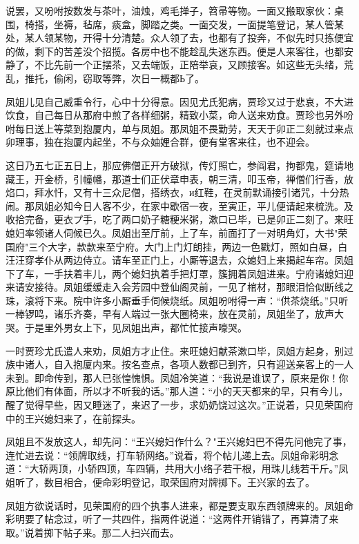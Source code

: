 说罢，又吩咐按数发与茶叶，油烛，鸡毛掸子，笤帚等物。一面又搬取家伙：桌围，椅搭，坐褥，毡席，痰盒，脚踏之类。一面交发，一面提笔登记，某人管某处，某人领某物，开得十分清楚。众人领了去，也都有了投奔，不似先时只拣便宜的做，剩下的苦差没个招揽。各房中也不能趁乱失迷东西。便是人来客往，也都安静了，不比先前一个正摆茶，又去端饭，正陪举哀，又顾接客。如这些无头绪，荒乱，推托，偷闲，窃取等弊，次日一概都Ь了。

凤姐儿见自己威重令行，心中十分得意。因见尤氏犯病，贾珍又过于悲哀，不大进饮食，自己每日从那府中煎了各样细粥，精致小菜，命人送来劝食。贾珍也另外吩咐每日送上等菜到抱厦内，单与凤姐。那凤姐不畏勤劳，天天于卯正二刻就过来点卯理事，独在抱厦内起坐，不与众妯娌合群，便有堂客来往，也不迎会。

这日乃五七正五日上，那应佛僧正开方破狱，传灯照亡，参阎君，拘都鬼，筵请地藏王，开金桥，引幢幡，那道士们正伏章申表，朝三清，叩玉帝，禅僧们行香，放焰口，拜水忏，又有十三众尼僧，搭绣衣，и红鞋，在灵前默诵接引诸咒，十分热闹。那凤姐必知今日人客不少，在家中歇宿一夜，至寅正，平儿便请起来梳洗。及收拾完备，更衣プ手，吃了两口奶子糖粳米粥，漱口已毕，已是卯正二刻了。来旺媳妇率领诸人伺候已久。凤姐出至厅前，上了车，前面打了一对明角灯，大书"荣国府"三个大字，款款来至宁府。大门上门灯朗挂，两边一色戳灯，照如白昼，白汪汪穿孝仆从两边侍立。请车至正门上，小厮等退去，众媳妇上来揭起车帘。凤姐下了车，一手扶着丰儿，两个媳妇执着手把灯罩，簇拥着凤姐进来。宁府诸媳妇迎来请安接待。凤姐缓缓走入会芳园中登仙阁灵前，一见了棺材，那眼泪恰似断线之珠，滚将下来。院中许多小厮垂手伺候烧纸。凤姐吩咐得一声：“供茶烧纸。”只听一棒锣鸣，诸乐齐奏，早有人端过一张大圈椅来，放在灵前，凤姐坐了，放声大哭。于是里外男女上下，见凤姐出声，都忙忙接声嚎哭。

一时贾珍尤氏遣人来劝，凤姐方才止住。来旺媳妇献茶漱口毕，凤姐方起身，别过族中诸人，自入抱厦内来。按名查点，各项人数都已到齐，只有迎送亲客上的一人未到。即命传到，那人已张惶愧惧。凤姐冷笑道：“我说是谁误了，原来是你！你原比他们有体面，所以才不听我的话。”那人道：“小的天天都来的早，只有今儿，醒了觉得早些，因又睡迷了，来迟了一步，求奶奶饶过这次。”正说着，只见荣国府中的王兴媳妇来了，在前探头。

凤姐且不发放这人，却先问：“王兴媳妇作什么？"王兴媳妇巴不得先问他完了事，连忙进去说：“领牌取线，打车轿网络。”说着，将个帖儿递上去。凤姐命彩明念道：“大轿两顶，小轿四顶，车四辆，共用大小络子若干根，用珠儿线若干斤。”凤姐听了，数目相合，便命彩明登记，取荣国府对牌掷下。王兴家的去了。

凤姐方欲说话时，见荣国府的四个执事人进来，都是要支取东西领牌来的。凤姐命彩明要了帖念过，听了一共四件，指两件说道：“这两件开销错了，再算清了来取。”说着掷下帖子来。那二人扫兴而去。


